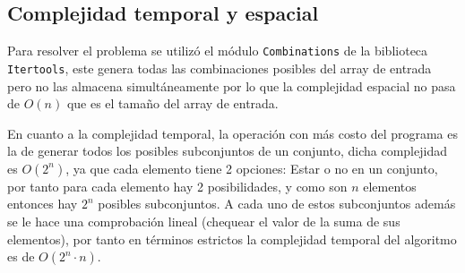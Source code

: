 \documentclass[11pt]{article}
\begin{document}
    \subsection{Complejidad temporal y espacial}
    Para resolver el problema se utilizó el módulo \texttt{Combinations} de la biblioteca \texttt{Itertools}, este genera todas
    las combinaciones posibles del array de entrada pero no las almacena simultáneamente por lo que la complejidad espacial no pasa 
    de $O(n)$ que es el tamaño del array de entrada.

    En cuanto a la complejidad temporal, la operación con más costo del programa es la de generar todos los posibles subconjuntos de
    un conjunto, dicha complejidad es $O(2^n)$, ya que cada elemento tiene 2 opciones: Estar o no en un conjunto, por tanto
    para cada elemento hay 2 posibilidades, y como son $n$ elementos entonces hay $2^n$ posibles subconjuntos. A cada uno de estos
    subconjuntos además se le hace una comprobación lineal (chequear el valor de la suma de sus elementos), por tanto en términos
    estrictos la complejidad temporal del algoritmo es de $O(2^n \cdot n)$. 
    
\end{document}
